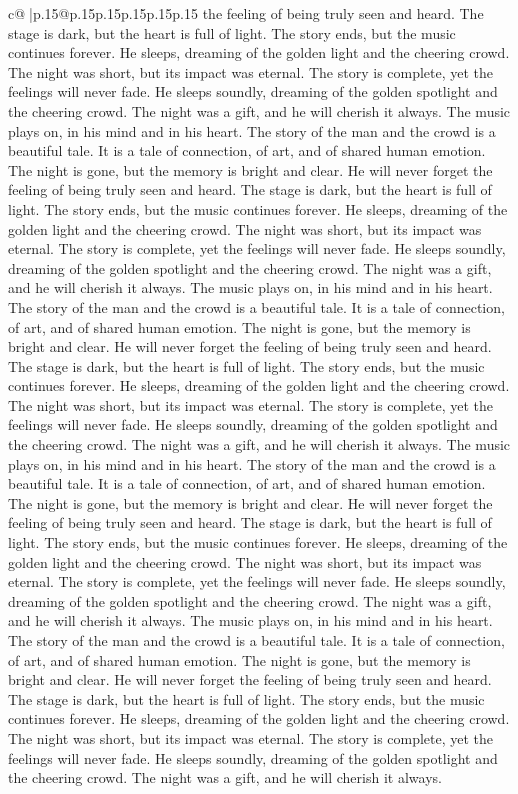 \documentclass{article}
\begin{document}
{\begin{supertabular}{c@{$\;$}|p{.15\linewidth}@{}p{.15\linewidth}p{.15\linewidth}p{.15\linewidth}p{.15\linewidth}p{.15\linewidth}}
{{{the feeling of being truly seen and heard. The stage is dark, but the heart is full of light. The story ends, but the music continues forever. He sleeps, dreaming of the golden light and the cheering crowd. The night was short, but its impact was eternal. The story is complete, yet the feelings will never fade. He sleeps soundly, dreaming of the golden spotlight and the cheering crowd. The night was a gift, and he will cherish it always. The music plays on, in his mind and in his heart. The story of the man and the crowd is a beautiful tale. It is a tale of connection, of art, and of shared human emotion. The night is gone, but the memory is bright and clear. He will never forget the feeling of being truly seen and heard. The stage is dark, but the heart is full of light. The story ends, but the music continues forever. He sleeps, dreaming of the golden light and the cheering crowd. The night was short, but its impact was eternal. The story is complete, yet the feelings will never fade. He sleeps soundly, dreaming of the golden spotlight and the cheering crowd. The night was a gift, and he will cherish it always. The music plays on, in his mind and in his heart. The story of the man and the crowd is a beautiful tale. It is a tale of connection, of art, and of shared human emotion. The night is gone, but the memory is bright and clear. He will never forget the feeling of being truly seen and heard. The stage is dark, but the heart is full of light. The story ends, but the music continues forever. He sleeps, dreaming of the golden light and the cheering crowd. The night was short, but its impact was eternal. The story is complete, yet the feelings will never fade. He sleeps soundly, dreaming of the golden spotlight and the cheering crowd. The night was a gift, and he will cherish it always. The music plays on, in his mind and in his heart. The story of the man and the crowd is a beautiful tale. It is a tale of connection, of art, and of shared human emotion. The night is gone, but the memory is bright and clear. He will never forget the feeling of being truly seen and heard. The stage is dark, but the heart is full of light. The story ends, but the music continues forever. He sleeps, dreaming of the golden light and the cheering crowd. The night was short, but its impact was eternal. The story is complete, yet the feelings will never fade. He sleeps soundly, dreaming of the golden spotlight and the cheering crowd. The night was a gift, and he will cherish it always. The music plays on, in his mind and in his heart. The story of the man and the crowd is a beautiful tale. It is a tale of connection, of art, and of shared human emotion. The night is gone, but the memory is bright and clear. He will never forget the feeling of being truly seen and heard. The stage is dark, but the heart is full of light. The story ends, but the music continues forever. He sleeps, dreaming of the golden light and the cheering crowd. The night was short, but its impact was eternal. The story is complete, yet the feelings will never fade. He sleeps soundly, dreaming of the golden spotlight and the cheering crowd. The night was a gift, and he will cherish it always. }}}
\end{supertabular}}
\end{document}
